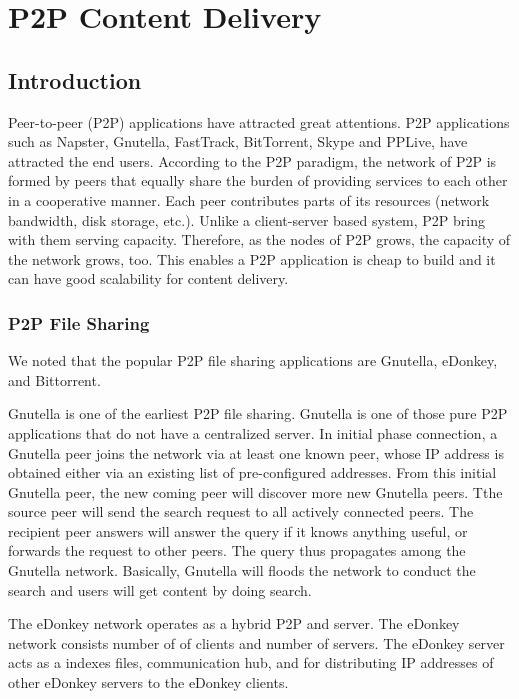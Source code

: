 \chapter{P2P Content Delivery}
\section{Introduction}

Peer-to-peer (P2P) applications have attracted great attentions.
P2P applications such as Napster, Gnutella, FastTrack, BitTorrent, Skype and PPLive, have attracted the end users.
According to the P2P paradigm, the network of P2P is formed by peers that equally share the burden of providing services to each other in a cooperative manner.
Each peer contributes parts of its resources (network bandwidth, disk storage, etc.).
Unlike a client-server based system, P2P bring with them serving capacity. 
Therefore, as the nodes of P2P grows, the capacity of the network grows, too. 
This enables a P2P application is cheap to build and it can have good scalability for content delivery.  


\subsection{P2P File Sharing}
We noted that the popular P2P file sharing applications are Gnutella, eDonkey, and Bittorrent.  

Gnutella is one of the earliest P2P file sharing.
Gnutella is one of those pure P2P applications that do not have a centralized server.
In initial phase connection, a Gnutella peer joins the network via at least one known peer, whose IP address is obtained either via an existing list of pre-configured addresses.
From this initial Gnutella peer, the new coming peer will discover more new Gnutella peers.
Tthe source peer will send the search request to all actively connected peers. 
The recipient peer answers will answer the query if it knows anything useful, or forwards the request to other peers.
The query thus propagates among the Gnutella network.
Basically, Gnutella will floods the network to conduct the search and users will get content by doing search.

The eDonkey network operates as a hybrid P2P and server. 
The eDonkey network consists number of of clients and number of servers. 
The eDonkey server acts as a indexes files, communication hub, and for distributing IP addresses of other eDonkey servers to the eDonkey clients.



